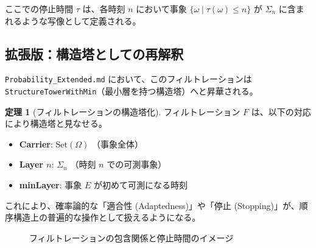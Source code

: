 \documentclass[a4paper,11pt]{ltjsarticle}
\theoremstyle{definition}
\newtheorem{theorem}[definition]{定理}
\newcommand{\OmegaSpace}{\Omega}
\newcommand{\Tau}{\tau}
\begin{document}
ここでの停止時間 $\Tau$ は、各時刻 $n$ において事象 $\{\omega \mid \Tau(\omega) \le n\}$ が $\Sigma_n$ に含まれるような写像として定義される。

\subsection{拡張版：構造塔としての再解釈}
\texttt{Probability\_Extended.md} において、このフィルトレーションは \texttt{StructureTowerWithMin}（最小層を持つ構造塔）へと昇華される。

\begin{theorem}[フィルトレーションの構造塔化]
フィルトレーション $F$ は、以下の対応により構造塔と見なせる。
\begin{itemize}
    \item \textbf{Carrier}: $\text{Set}(\OmegaSpace)$ （事象全体）
    \item \textbf{Layer $n$}: $\Sigma_n$ （時刻 $n$ での可測事象）
    \item \textbf{minLayer}: 事象 $E$ が初めて可測になる時刻
\end{itemize}
\end{theorem}

これにより、確率論的な「適合性 (Adaptedness)」や「停止 (Stopping)」が、順序構造上の普遍的な操作として扱えるようになる。

\begin{figure}[h]
\centering
{}
\caption{フィルトレーションの包含関係と停止時間のイメージ}
\end{figure}

\end{document}

